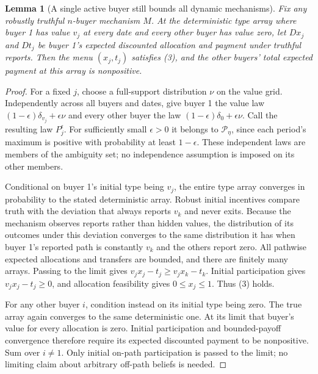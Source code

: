 \documentclass[11pt]{article}
\newtheorem{lemma}[theorem]{Lemma}
\theoremstyle{remark}\newtheorem{remark}[theorem]{Remark}
\begin{document}
\begin{lemma}[A single active buyer still bounds all dynamic mechanisms]
Fix any robustly truthful $n$-buyer mechanism $M$. At the deterministic
type array where buyer 1 has value $v_j$ at every date and every other
buyer has value zero, let $Dx_j$ and $Dt_j$ be buyer 1's expected
discounted allocation and payment under truthful reports. Then the menu
$(x_j,t_j)$ satisfies (3), and the other buyers' total expected payment
at this array is nonpositive.
\end{lemma}
\begin{proof}
For a fixed $j$, choose a full-support distribution $\nu$ on the value
grid. Independently across all buyers and dates, give buyer 1 the value
law $(1-\epsilon)\delta_{v_j}+\epsilon\nu$ and every other buyer the
law $(1-\epsilon)\delta_0+\epsilon\nu$. Call the resulting law
$P_j^\epsilon$. For sufficiently small $\epsilon>0$ it belongs to
$\mathcal P_\eta$, since each period's maximum is positive with
probability at least $1-\epsilon$. These independent laws are members
of the ambiguity set; no independence assumption is imposed on its
other members.

Conditional on buyer 1's initial type being $v_j$, the entire type array
converges in probability to the stated deterministic array. Robust initial
incentives compare truth with the deviation that always reports $v_k$
and never exits. Because the mechanism observes reports rather than
hidden values, the distribution of its outcomes under this deviation
converges to the same distribution it has when buyer 1's reported path
is constantly $v_k$ and the others report zero. All pathwise expected
allocations and transfers are bounded, and there are finitely many
arrays. Passing to the limit gives
$v_jx_j-t_j\geq v_jx_k-t_k$. Initial participation gives
$v_jx_j-t_j\geq0$, and allocation feasibility gives $0\leq x_j\leq1$.
Thus (3) holds.

For any other buyer $i$, condition instead on its initial type being zero.
The true array again converges to the same deterministic one. At its
limit that buyer's value for every allocation is zero. Initial
participation and bounded-payoff convergence therefore require its
expected discounted payment to be nonpositive. Sum over $i\ne1$.
Only initial on-path participation is passed to the limit; no limiting
claim about arbitrary off-path beliefs is needed.
\end{proof}
\end{document}
